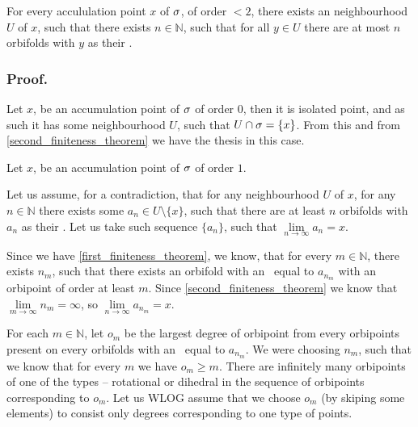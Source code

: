 


\begin{theorem}\label{order <2 boundness}
For every accululation point $x$ of ${\sigma}$, of order $<2$, there exists an neighbourhood $U$ 
of $x$, such that there exists $n \in \mathbb{N}$, such that for all $y \in U$ there are at most 
$n$ orbifolds with $y$ as their \Eoc.
\end{theorem}
\subsubsection{Proof.} 
Let $x$, be an accumulation point of ${\sigma}$ of order $0$, then it is isolated point, and as such 
it has some neighbourhood $U$, such that $U\cap {\sigma} = \{x\}$. From this and from 
\ref{second_finiteness_theorem} we have the thesis in this case. 

Let $x$, be an accumulation point of ${\sigma}$ of order $1$. 

Let us assume, for a contradiction, that for any neighbourhood $U$ of $x$,  
for any $n \in \mathbb{N}$ there exists some $a_n \in U \setminus \{x\}$, such that 
there are at least $n$ orbifolds with $a_n$ as their \Eoc. 
Let us take such sequence $\{a_n\}$, such that $\lim\limits_{n\to \infty} a_n = x$. 

Since we have \ref{first_finiteness_theorem}, we know, that for every $m \in \mathbb{N}$, 
there exists $n_m$, such that there exists an orbifold with an \Eoc\ equal to $a_{n_m}$ 
with an orbipoint of order at least $m$. Since \ref{second_finiteness_theorem} we know 
that $\lim\limits_{m\to \infty} n_m = \infty$, 
so $\lim\limits_{n\to \infty} a_{n_m} = x$. 

For each $m \in \mathbb{N}$, let $o_m$ be the largest degree of orbipoint from every orbipoints 
present on every orbifolds with an \Eoc\ equal to $a_{n_m}$. 
We were choosing $n_m$, such that we know that for every $m$ we have $o_m \geq m$. 
There are infinitely many orbipoints of one of the types -- rotational or dihedral in the 
sequence of orbipoints corresponding to $o_m$. 
Let us WLOG assume that we choose $o_m$ (by skiping some elements) 
to consist only degrees corresponding to one type 
of points.

